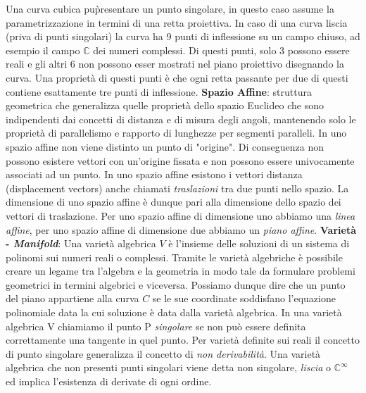 \documentclass[a4paper,12pt]{tesiinfo}
\begin{document}
\newline
Una curva cubica pu\` presentare un punto singolare, in questo caso assume la parametrizzazione in termini di una retta proiettiva. In caso di una curva liscia (priva di punti singolari) la curva ha 9 punti di inflessione su un campo chiuso, ad esempio il campo $\mathbb{C}$ dei numeri complessi. Di questi punti, solo 3 possono essere reali e gli altri 6 non possono esser mostrati nel piano proiettivo disegnando la curva. Una propriet\`a di questi punti \`e che ogni retta passante per due di questi contiene esattamente tre punti di inflessione.
\newline\newline
%
%
%
\textbf{Spazio Affine}: struttura geometrica che generalizza quelle propriet\`a dello spazio Euclideo che sono indipendenti dai concetti di distanza e di misura degli angoli, mantenendo solo le propriet\`a di parallelismo e rapporto di lunghezze per segmenti paralleli. In uno spazio affine non viene distinto un punto di "origine". Di conseguenza non possono esistere vettori con un'origine fissata e non possono essere univocamente associati ad un punto. In uno spazio affine esistono i vettori distanza (displacement vectors) anche chiamati \textit{traslazioni} tra due punti nello spazio. La dimensione di uno spazio affine \`e dunque pari alla dimensione dello spazio dei vettori di traslazione. Per uno spazio affine di dimensione uno abbiamo una \textit{linea affine}, per uno spazio affine di dimensione due abbiamo un \textit{piano affine}.
\newline\newline
%
%
%
\textbf{Variet\`a - \textit{Manifold}}: Una variet\`a algebrica $V$ \`e l'insieme delle soluzioni di un sistema di polinomi sui numeri reali o complessi. Tramite le variet\`a algebriche \`e possibile creare un legame tra l'algebra e la geometria in modo tale da formulare problemi geometrici in termini algebrici e viceversa. Possiamo dunque dire che un punto del piano appartiene alla curva $C$ se le sue coordinate soddisfano l'equazione polinomiale data la cui soluzione \`e data dalla variet\`a algebrica.
In una variet\`a algebrica V chiamiamo il punto P \textit{singolare} se non pu\`o essere definita correttamente una tangente in quel punto. Per variet\`a definite sui reali il concetto di punto singolare generalizza il concetto di \textit{non derivabilit\`a}. Una variet\`a algebrica che non presenti punti singolari viene detta non singolare, \textit{liscia} o $\mathbb{C}^ {\infty}$ ed implica l'esistenza di derivate di ogni ordine.
\end{document}
